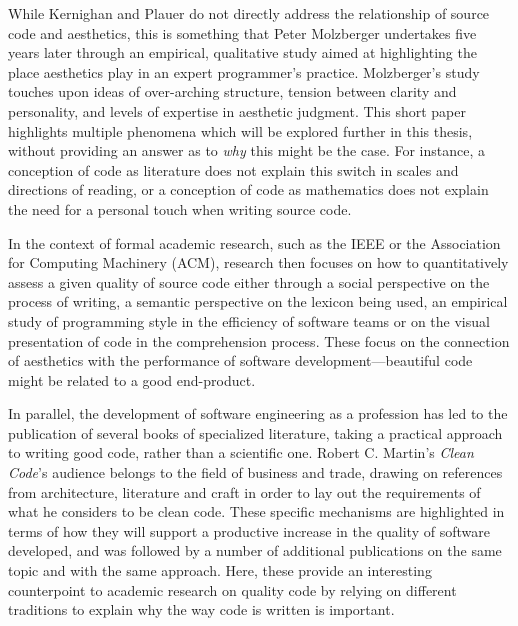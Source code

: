 While Kernighan and Plauer do not directly address the relationship of source code and aesthetics, this is something that Peter Molzberger undertakes five years later through an empirical, qualitative study aimed at highlighting the place aesthetics play in an expert programmer's practice\cite{molzberger_aesthetics_1983}. Molzberger's study touches upon ideas of over-arching structure, tension between clarity and personality, and levels of expertise in aesthetic judgment. This short paper highlights multiple phenomena which will be explored further in this thesis, without providing an answer as to \emph{why} this might be the case. For instance, a conception of code as literature does not explain this switch in scales and directions of reading, or a conception of code as mathematics does not explain the need for a personal touch when writing source code\cite{molzberger_aesthetics_1983}.

In the context of formal academic research, such as the IEEE or the Association for Computing Machinery (ACM), research then focuses on how to quantitatively assess a given quality of source code either through a social perspective on the process of writing\cite{norick_effects_2010}, a semantic perspective on the lexicon being used\cite{fakhoury_improving_2019,guerrouj_normalizing_2013}, an empirical study of programming style in the efficiency of software teams\cite{reed_sometimes_2010} or on the visual presentation of code in the comprehension process\cite{marcus_graphic_1982}. These focus on the connection of aesthetics with the performance of software development—beautiful code might be related to a good end-product.

In parallel, the development of software engineering as a profession has led to the publication of several books of specialized literature, taking a practical approach to writing good code, rather than a scientific one. Robert C. Martin's \emph{Clean Code}'s audience belongs to the field of business and trade, drawing on references from architecture, literature and craft in order to lay out the requirements of what he considers to be clean code. These specific mechanisms are highlighted in terms of how they will support a productive increase in the quality of software developed, and was followed by a number of additional publications on the same topic and with the same approach\cite{fowler_refactoring_1999,arns_code_2005,hunt_pragmatic_1999}. Here, these provide an interesting counterpoint to academic research on quality code by relying on different traditions to explain why the way code is written is important.

